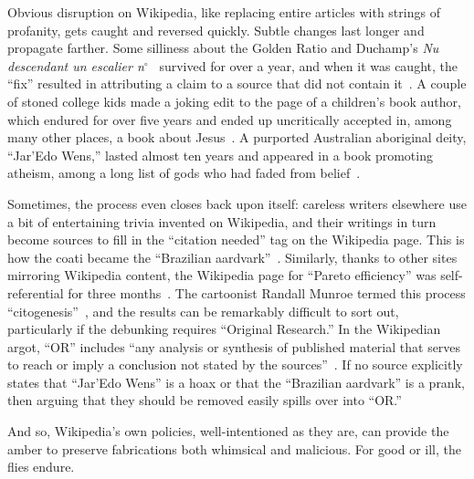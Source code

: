 \documentclass[aps,pra,superscriptaddress,12pt,tightenlines,nofootinbib]{revtex4}
\newcommand{\booktitle}{\textsl}
\begin{document}
Obvious disruption on Wikipedia, like replacing entire articles with
strings of profanity, gets caught and reversed quickly.  Subtle
changes last longer and propagate farther.  Some silliness about the
Golden Ratio and Duchamp's \booktitle{Nu descendant un escalier
  n$^\circ$~} survived for over a year, and when it was caught, the
``fix'' resulted in attributing a claim to a source that did not
contain it~\cite{sunclipse-duchamp}.  A couple of stoned college kids
made a joking edit to the page of a children's book author, which
endured for over five years and ended up uncritically accepted in,
among many other places, a book about Jesus~\cite{Dickson2014}.  A
purported Australian aboriginal deity, ``Jar'Edo Wens,'' lasted almost
ten years and appeared in a book promoting atheism, among a long list
of gods who had faded from belief~\cite{Dewey2015}.

Sometimes, the process even closes back upon itself: careless writers
elsewhere use a bit of entertaining trivia invented on Wikipedia, and
their writings in turn become sources to fill in the ``citation
needed'' tag on the Wikipedia page.  This is how the coati became the
``Brazilian aardvark''~\cite{Randall2014}.  Similarly, thanks to other
sites mirroring Wikipedia content, the Wikipedia page for ``Pareto
efficiency'' was self-referential for three months~\cite{Granade2014}.
The cartoonist Randall Munroe termed this process
``citogenesis''~\cite{Munroe2011}, and the results can be remarkably
difficult to sort out, particularly if the debunking requires
``Original Research.'' In the Wikipedian argot, ``OR'' includes ``any
analysis or synthesis of published material that serves to reach or
imply a conclusion not stated by the sources''~\cite{WPNOR}.  If no
source explicitly states that ``Jar'Edo Wens'' is a hoax or that the
``Brazilian aardvark'' is a prank, then arguing that they should be
removed easily spills over into ``OR.''

And so, Wikipedia's own policies, well-intentioned as they are, can
provide the amber to preserve fabrications both whimsical and
malicious.  For good or ill, the flies endure.
\end{document}
